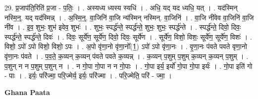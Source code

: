 \documentclass[17pt]{extarticle}
\begin{document}
29. प्र॒जाप॑ति॒रिति॑ प्र॒जा - प॒तिः॒ । . अस्यध्य ध्यस्य स्यधि॑ । . अधि॒ यद् यद ध्यधि॒ यत् । . यद॑स्मिन् नस्मि॒न्॒. यद् यद॑स्मिन्न् । . अ॒स्मि॒न्॒. वा॒जिनि॑ वा॒जि न्य॑स्मिन् नस्मिन्. वा॒जिनि॑ । . वा॒जि नी॑वेव वा॒जिनि॑ वा॒जि नी॑व । . इ॒व॒ शुभः॒ शुभ॑ इवेव॒ शुभः॑ । . शुभः॒ स्पर्द्ध॑न्ते॒ स्पर्द्ध॑न्ते॒ शुभः॒ शुभः॒ स्पर्द्ध॑न्ते । . स्पर्द्ध॑न्ते॒ दिवो॒ दिवः॒ स्पर्द्ध॑न्ते॒ स्पर्द्ध॑न्ते॒ दिवः॑ । . दिवः॒ सूर्ये॑ण॒ सूर्ये॑ण॒ दिवो॒ दिवः॒ सूर्ये॑ण । . सूर्ये॑ण॒ विशो॒ विशः॒ सूर्ये॑ण॒ सूर्ये॑ण॒ विशः॑ । . विशो॒ ऽपो॑ ऽपो विशो॒ विशो॒ ऽपः । . अ॒पो वृ॑णा॒नो वृ॑णा॒नो᳚(1॒) ऽपो॑ ऽपो वृ॑णा॒नः । . वृ॒णा॒नः प॑वते पवते वृणा॒नो वृ॑णा॒नः प॑वते । . प॒व॒ते॒ क॒व्यन् क॒व्यन् प॑वते पवते क॒व्यन्न् । . क॒व्यन् प॒शुम् प॒शुम् क॒व्यन् क॒व्यन् प॒शुम् । . प॒शुन् न न प॒शुम् प॒शुन् न । . न गो॒पा गो॒पा न न गो॒पाः । . गो॒पा इर्य॒ इर्यो॑ गो॒पा गो॒पा इर्यः॑ । . गो॒पा इति॑ गो - पाः । . इर्यः॒ परि॑ज्मा॒ परि॒ज्मेर्य॒ इर्यः॒ परि॑ज्मा । . परि॒ज्मेति॒ परि॑ - ज्मा॒ । \newline

\textbf{Ghana Paata } \newline
\end{document}
